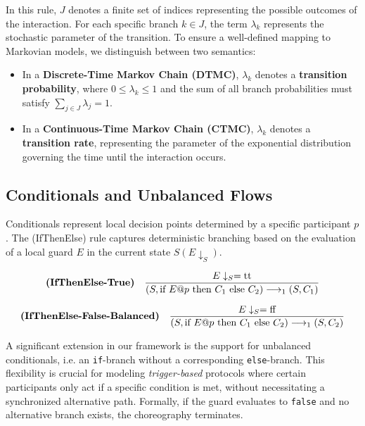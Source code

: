 In this rule, $J$ denotes a finite set of indices representing the possible outcomes of the interaction. For each specific branch $k \in J$, the term $\lambda_{k}$ represents the stochastic parameter of the transition. To ensure a well-defined mapping to Markovian models, we distinguish between two semantics:
\begin{itemize}
	\item In a \textbf{Discrete-Time Markov Chain (DTMC)}, $\lambda_{k}$ denotes a \textbf{transition probability}, where $0 \le \lambda_{k} \le 1$ and the sum of all branch probabilities must satisfy $\sum_{j \in J} \lambda_{j} = 1$.
	\item In a \textbf{Continuous-Time Markov Chain (CTMC)}, $\lambda_{k}$ denotes a \textbf{transition rate}, representing the parameter of the exponential distribution governing the time until the interaction occurs.
\end{itemize}


\subsection{Conditionals and Unbalanced Flows} 
\label{paragraph:conditionals}
Conditionals represent local decision points determined by a specific participant $p$. The (IfThenElse) rule captures deterministic branching based on the evaluation of a local guard $E$ in the current state $S(E\downarrow_{S})$. 

\begin{equation}
	\textbf{(IfThenElse-True)}~~~
	\frac{E \downarrow_S = \textnormal{tt}}{(S, \textnormal{if } E@p \textnormal{ then } C_1 \textnormal{ else } C_2) \longrightarrow_{1} (S, C_1)}
\end{equation}

\begin{equation}
	\textbf{(IfThenElse-False-Balanced)}~~~
	\frac{E \downarrow_S = \textnormal{ff}}{(S, \textnormal{if } E@p \textnormal{ then } C_1 \textnormal{ else } C_2) \longrightarrow_{1} (S, C_2)}
\end{equation}

A significant extension in our framework is the support for unbalanced conditionals, i.e. an \texttt{if}-branch without a corresponding \texttt{else}-branch. This flexibility is crucial for modeling \textit{trigger-based} protocols where certain participants only act if a specific condition is met, without necessitating a synchronized alternative path. Formally, if the guard evaluates to \texttt{false} and no alternative branch exists, the choreography terminates.

